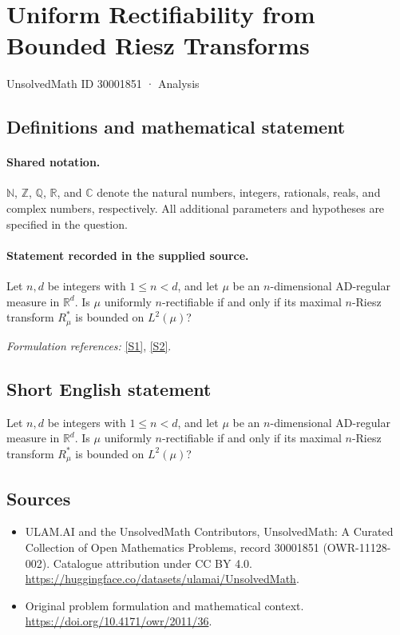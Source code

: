 \documentclass[11pt]{article}
\newcommand{\sref}[2]{\hyperlink{source:#1:#2}{[S#2]}}
\begin{document}
\setcounter{section}{30001850}
\section{Uniform Rectifiability from Bounded Riesz Transforms}\label{30001851}
{\small UnsolvedMath ID 30001851 · Analysis}
\subsection{Definitions and mathematical statement}

\paragraph{Shared notation.}$\mathbb N$, $\mathbb Z$, $\mathbb Q$, $\mathbb R$, and $\mathbb C$ denote the natural numbers, integers, rationals, reals, and complex numbers, respectively. All additional parameters and hypotheses are specified in the question.


\paragraph{Statement recorded in the supplied source.}
Let $n,d$ be integers with $1\le n<d$, and let $\mu$ be an $n$-dimensional AD-regular measure in $\mathbb R^d$. Is $\mu$ uniformly $n$-rectifiable if and only if its maximal $n$-Riesz transform $R_\mu^*$ is bounded on $L^2(\mu)$?
\par\smallskip\textit{Formulation references:} \sref{30001851}{1}, \sref{30001851}{2}.
\subsection{Short English statement}
Let $n,d$ be integers with $1\le n<d$, and let $\mu$ be an $n$-dimensional AD-regular measure in $\mathbb R^d$. Is $\mu$ uniformly $n$-rectifiable if and only if its maximal $n$-Riesz transform $R_\mu^*$ is bounded on $L^2(\mu)$?
\subsection{Sources}
\begin{itemize}
\item[\hypertarget{source:30001851:1}{S1}] ULAM.AI and the UnsolvedMath Contributors, UnsolvedMath: A Curated Collection of Open Mathematics Problems, record 30001851 (OWR-11128-002). Catalogue attribution under CC BY 4.0.
\url{https://huggingface.co/datasets/ulamai/UnsolvedMath}.
\item[\hypertarget{source:30001851:2}{S2}] Original problem formulation and mathematical context.
\url{https://doi.org/10.4171/owr/2011/36}.
\end{itemize}
\label{end:30001851}
\end{document}
